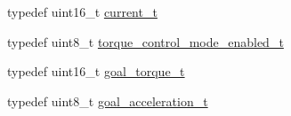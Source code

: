 \begin{DoxyCompactItemize}
\item 
typedef uint16\+\_\+t \hyperlink{structdynamixel_1_1servos_1_1_model_traits_3_01_mx106_01_4_1_1_c_t_ad0c017f193382bc359e9e1d70d64ee09}{current\+\_\+t}
\item 
typedef uint8\+\_\+t \hyperlink{structdynamixel_1_1servos_1_1_model_traits_3_01_mx106_01_4_1_1_c_t_a5ada4a7b5e63dbebc22ac877c849cac0}{torque\+\_\+control\+\_\+mode\+\_\+enabled\+\_\+t}
\item 
typedef uint16\+\_\+t \hyperlink{structdynamixel_1_1servos_1_1_model_traits_3_01_mx106_01_4_1_1_c_t_a6d972bcfd17c808b2d414592f03e93a9}{goal\+\_\+torque\+\_\+t}
\item 
typedef uint8\+\_\+t \hyperlink{structdynamixel_1_1servos_1_1_model_traits_3_01_mx106_01_4_1_1_c_t_aca4ad8bc8875d5e7c51734cc4e9d1c7b}{goal\+\_\+acceleration\+\_\+t}
\end{DoxyCompactItemize}
